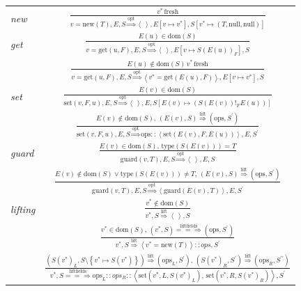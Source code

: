 \documentclass{sigplanconf}
\begin{document}
\begin{figure}
\begin{center}
\begin{tabular}{lc}
\emph{new} & ${\displaystyle \frac{v^{*}\,\mathrm{fresh}}{v=\mathrm{new}(T),E,S\overset{\mathrm{opt}}{\Longrightarrow}\left\langle \,\right\rangle ,E\left[v\mapsto v^{*}\right],S\left[v^{*}\mapsto\left(T,\mathrm{null,null}\right)\right]}}$\tabularnewline[3em]
\emph{get} & ${\displaystyle \frac{E(u)\in\mathrm{dom}(S)}{v=\mathrm{get}(u,F),E,S\overset{\mathrm{opt}}{\Longrightarrow}\left\langle \,\right\rangle ,E\left[v\mapsto S(E(u))_{F}\right],S}}$\tabularnewline[3em]
 & ${\displaystyle \frac{E(u)\notin\mathrm{dom}(S)\, v^{*}\,\mathrm{fresh}}{v=\mathrm{get}(u,F),E,S\overset{\mathrm{opt}}{\Longrightarrow}\left\langle v^{*}=\mathrm{get}(E(u),F)\right\rangle ,E\left[v\mapsto v^{*}\right],S}}$\tabularnewline[3em]
\emph{set} & ${\displaystyle \frac{E(v)\in\mathrm{dom}(S)}{\mathrm{set}\left(v,F,u\right),E,S\overset{\mathrm{opt}}{\Longrightarrow}\left\langle \,\right\rangle ,E,S\left[E\left(v\right)\mapsto\left(S(E(v))!_{F}E(u)\right)\right]}}$\tabularnewline[3em]
 & ${\displaystyle \frac{E(v)\notin\mathrm{dom}\left(S\right),\,\left(E(v),S\right)\overset{\mathrm{lift}}{\Longrightarrow}\left(\mathrm{ops},S^{\prime}\right)}{\mathrm{set}\left(v,F,u\right),E,S\overset{\mathrm{opt}}{\Longrightarrow}\mathrm{ops}::\left\langle \mathrm{set}\left(E(v),F,E(u)\right)\right\rangle ,E,S^{\prime}}}$\tabularnewline[3em]
\emph{guard} & ${\displaystyle \frac{E(v)\in\mathrm{dom}(S),\,\mathrm{type}(S(E(v)))=T}{\mathrm{guard}(v,T),E,S\overset{\mathrm{opt}}{\Longrightarrow}\left\langle \,\right\rangle ,E,S}}$\tabularnewline[3em]
 & ${\displaystyle \frac{E(v)\notin\mathrm{dom}(S)\vee\mathrm{type}(S(E(v)))\neq T,\,\left(E(v),S\right)\overset{\mathrm{lift}}{\Longrightarrow}\left(\mathrm{ops},S^{\prime}\right)}{\mathrm{guard}(v,T),E,S\overset{\mathrm{opt}}{\Longrightarrow}\left\langle \mathrm{guard}(E\left(v\right),T)\right\rangle ,E,S^{\prime}}}$\tabularnewline[3em]
\emph{lifting} & ${\displaystyle \frac{v^{*}\notin\mathrm{dom}(S)}{v^{*},S\overset{\mathrm{lift}}{\Longrightarrow}\left\langle \,\right\rangle ,S}}$\tabularnewline[3em]
 & ${\displaystyle \frac{v^{*}\in\mathrm{dom}(S),\,\left(v^{*},S\right)\overset{\mathrm{liftfields}}{=\!=\!\Longrightarrow}\left(\mathrm{ops},S^{\prime}\right)}{v^{*},S\overset{\mathrm{lift}}{\Longrightarrow}\left\langle v^{*}=\mathrm{new}\left(T\right)\right\rangle ::ops,S^{\prime}}}$\tabularnewline[3em]
 & ${\displaystyle \frac{\left(S\left(v^{*}\right)_{L},S\setminus\left\{ v^{*}\mapsto S\left(v^{*}\right)\right\} \right)\overset{\mathrm{lift}}{\Longrightarrow}\left(\mathrm{ops}_{L},S^{\prime}\right),\,\left(S\left(v^{*}\right)_{R},S^{\prime}\right)\overset{\mathrm{lift}}{\Longrightarrow}\left(\mathrm{ops}_{R},S^{\prime\prime}\right)}{v^{*},S\overset{\mathrm{liftfields}}{=\!=\!\Longrightarrow}\mathrm{ops}_{L}::ops_{R}::\left\langle \mathrm{set}\left(v^{*},L,S\left(v^{*}\right)_{L}\right),\,\mathrm{set}\left(v^{*},R,S\left(v^{*}\right)_{R}\right)\right\rangle ,S^{\prime}}}$\tabularnewline[3em]
\end{tabular}


\end{center}
\end{figure}
\end{document}
